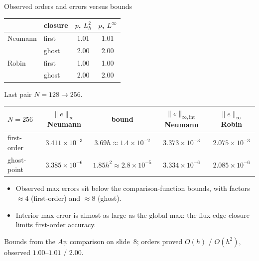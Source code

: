 \documentclass[aspectratio=169,8pt,t]{beamer}
\begin{document}
\begin{frame}{Observed orders and errors versus bounds}
\bodytop
{\tabfont\begin{tabular}{@{}llcc@{}}\toprule
 & closure & $p$, $L^2_h$ & $p$, $L^\infty$\\\midrule
Neumann & first & 1.01 & 1.01\\
 & ghost & 2.00 & 2.00\\
Robin & first & 1.00 & 1.00\\
 & ghost & 2.00 & 2.00\\\bottomrule
\end{tabular}}\blockgap
{\color{note}\notesize Last pair $N=128\to256$.\par}
\blockgap
{\tabfont\begin{tabular}{@{}lcccc@{}}\toprule
$N=256$ & $\|e\|_\infty$ Neumann & bound & $\|e\|_{\infty,\mathrm{int}}$ Neumann & $\|e\|_\infty$ Robin\\\midrule
first-order & $3.411\times10^{-3}$ & $3.69h\approx1.4\times10^{-2}$ & $3.373\times10^{-3}$ & $2.075\times10^{-3}$\\
ghost-point & $3.385\times10^{-6}$ & $1.85h^2\approx2.8\times10^{-5}$ & $3.334\times10^{-6}$ & $2.085\times10^{-6}$\\\bottomrule
\end{tabular}}
\blockgap
\begin{itemize}\setlength{\itemsep}{\blockskip}
\item Observed max errors sit below the comparison-function bounds, with factors $\approx4$ (first-order) and $\approx8$ (ghost).
\item Interior max error is almost as large as the global max: the flux-edge closure limits first-order accuracy.
\end{itemize}
\closing{Bounds from the $A\psi$ comparison on slide~8; orders proved $O(h)$ / $O(h^2)$, observed $1.00$--$1.01$ / $2.00$.}
\end{frame}
\end{document}
